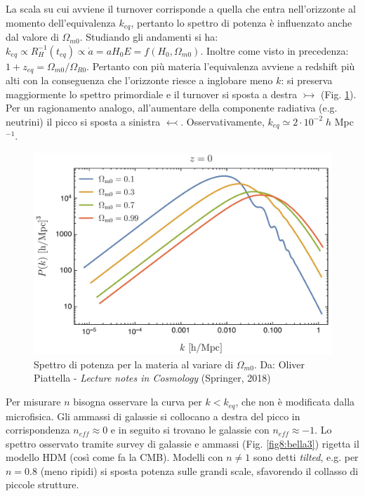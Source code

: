 La scala su cui avviene il turnover corrisponde a quella che entra nell'orizzonte al momento dell'equivalenza $k_{eq}$, pertanto lo spettro di potenza è influenzato anche dal valore di $\Omega_{m0}$. Studiando gli andamenti si ha: $k_{eq}\propto R_H^{-1}(t_{eq}) \propto \dot{a} = a H_0 E = f(H_0,\Omega_{m0})$. Inoltre come visto in precedenza: $1+z_{eq}=\Omega_{m0}/\Omega_{R0}$. Pertanto con più materia l'equivalenza avviene a redshift più alti con la conseguenza che l'orizzonte riesce a inglobare meno $k$: si preserva maggiormente lo spettro primordiale e il turnover si sposta a destra $\rightarrowtail $ (Fig. \ref{fig8:bella2}). Per un ragionamento analogo, all'aumentare della componente radiativa (e.g. neutrini) il picco si sposta a sinistra $\leftarrowtail $. Osservativamente, $k_{eq}\simeq 2\cdot 10^{-2}\; h$ Mpc$^{-1}$.
\begin{figure}[H]
    \centering
    \includegraphics[width=.6 \textwidth]{Pictures/8/pertmatevol.jpg}
    \caption{Spettro di potenza per la materia al variare di $\Omega_{m0}$. Da: Oliver Piattella - \textit{Lecture notes in Cosmology} (Springer, 2018)}\label{fig8:bella2} 
\end{figure}

Per misurare $n$ bisogna osservare la curva per $k<k_{eq}$, che non è modificata dalla microfisica. Gli ammassi di galassie si collocano a destra del picco in corrispondenza $n_{eff}\approx 0$ e in seguito si trovano le galassie con $n_{eff}\approx -1$. Lo spettro osservato tramite survey di galassie e ammassi (Fig. \ref{fig8:bella3}) rigetta il modello HDM (così come fa la CMB). Modelli con $n\neq 1$ sono detti \textit{tilted}, e.g. per $n=0.8$ (meno ripidi) si sposta potenza sulle grandi scale, sfavorendo il collasso di piccole strutture.

